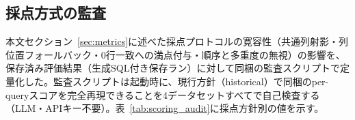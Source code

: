 \documentclass[twocolumn]{interact}
\makeatletter
\def\toprule{\noalign{\ifnum0=`}\fi
  \@aboverulesep=\abovetopsep
  \global\@belowrulesep=\belowrulesep
  \global\@thisruleclass=\@ne
  \@ifnextchar[{\@BTrule}{\@BTrule[\heavyrulewidth]}}
\def\midrule{\noalign{\ifnum0=`}\fi
  \@aboverulesep=\aboverulesep
  \global\@belowrulesep=\belowrulesep
  \global\@thisruleclass=\@ne
  \@ifnextchar[{\@BTrule}{\@BTrule[\lightrulewidth]}}
\def\bottomrule{\noalign{\ifnum0=`}\fi
  \@aboverulesep=\aboverulesep
  \global\@belowrulesep=\belowbottomsep
  \global\@thisruleclass=\@ne
  \@ifnextchar[{\@BTrule}{\@BTrule[\heavyrulewidth]}}
\makeatother
\begin{document}
\subsection{採点方式の監査}
\label{sec:sup_scoring_audit}

本文セクション~\ref{sec:metrics}に述べた採点プロトコルの寛容性（共通列射影・列位置フォールバック・0行一致への満点付与・順序と多重度の無視）の影響を、保存済み評価結果（生成SQL付き保存ラン）に対して同梱の監査スクリプトで定量化した。監査スクリプトは起動時に、現行方針（historical）で同梱のper-queryスコアを完全再現できることを4データセットすべてで自己検査する（LLM・APIキー不要）。表~\ref{tab:scoring_audit}に採点方針別の値を示す。

\begin{table}[htbp]
  \centering
  \caption{採点方針別の実行再現率（\%）。historical＝本文の採点方式。require all＝全ゴールド列の存在を要求。no positional＝列位置フォールバック無効。drop empty＝ゴールド0行クエリを分母から除外。multiset＝行の重複度を照合。exact＝厳密な完全結果集合一致（ゴールド列リスト、行の多重集合を照合し、行順序は期待結果の\texttt{semantic\_ordered}契約が真のクエリ（主評価では245件中39件）に限り照合）。ordered＝exactとは母集団の異なる別指標で、各データセットの\texttt{ORDER BY}付きゴールドクエリ（主評価では234件）に対する順序照合Recall；この列の定義は\texttt{semantic\_ordered}契約とは独立である。緩い完全一致（共通列射影上でPrecision=Recall=1；78.0\%）は本表の列には含めず、同梱の\texttt{scoring\_audit.json}に\texttt{common\_column\_exact\_overlap\_pct}として収録する。同JSONは、全ゴールド列必須・位置フォールバック無効・ゴールド0行除外・多重集合照合を同時に課す（順序照合のみ課さない）strict方針（主評価25.5\%、$n=241$）も収録する。いずれも生成SQL付き保存ラン（main: 245クエリ、historical Recall 86.1\%の単一ラン）に基づく。}
  \label{tab:scoring_audit}
  \footnotesize
\end{table}
\end{document}
